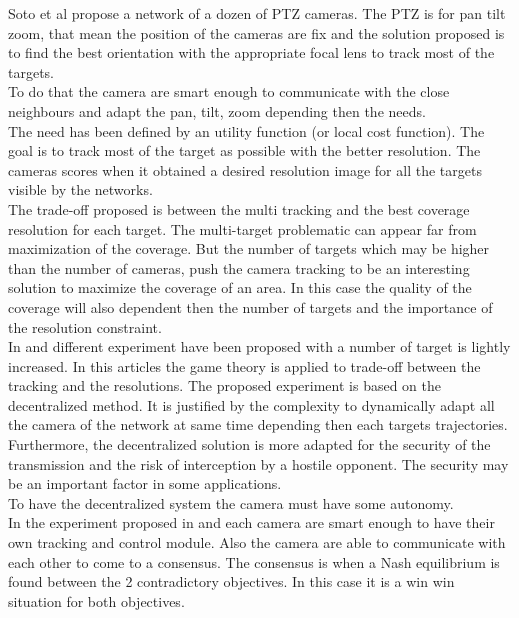 Soto et al \cite{12*soto2009} propose a network of a dozen of PTZ cameras. The PTZ is for pan tilt zoom, that mean the position of the cameras are fix and the solution proposed is to find the best orientation with the appropriate focal lens to track most of the targets.  \\
 To do that the camera are smart enough to communicate with the close neighbours and adapt the pan, tilt, zoom depending then the needs.\\
The need has been defined by an utility function (or local cost function). The goal is to track most of the target as possible with the better resolution. The cameras scores when it obtained a desired resolution image for all the targets visible by the networks.\\
The trade-off proposed is between the multi tracking and the best coverage resolution for each target. The multi-target problematic can appear far from maximization of the coverage. But the number of targets  which may be higher than the number of cameras, push the camera tracking to be an interesting solution to maximize the coverage of an area. In this case the quality of the coverage will also dependent then the number of targets and the importance of the resolution constraint.  \\
	 In \cite{18*ding2012} and \cite{25*song2008} different experiment have been proposed with a number of target is lightly increased.  In this articles the game theory is applied to trade-off between the tracking and the resolutions. The proposed experiment is based on the decentralized method. It is justified by the complexity to dynamically adapt all the camera of the network at same time depending then each targets trajectories.\\
	  Furthermore, the decentralized solution is more adapted for the security of the transmission and the risk of interception by a hostile opponent. The security may be an important factor in some applications. \\
To have the decentralized system the camera must have some autonomy. \\
In the experiment proposed in \cite{12*soto2009} and \cite{18*ding2012,25*song2008}  each camera are smart enough to have their own tracking  and control module. Also the camera are able to communicate with each other to come to a consensus. The consensus is when a Nash equilibrium is found between the 2 contradictory objectives. In this case it is a win win situation for both objectives.\\
